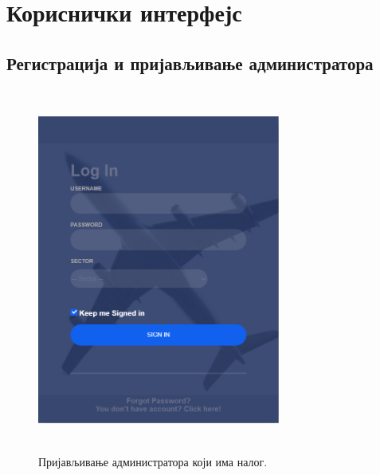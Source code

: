 \documentclass{article}
\begin{document}
\section{Кориснички интерфејс}
\subsection{Регистрација и пријављивање администратора}

\begin{figure}[H]
    \begin{center}
        \includegraphics[width=8cm, height=12cm]{Dizajn/login.png}
        \caption{Пријављивање администратора који има налог.}
    \end{center}
\end{figure}
\end{document}
